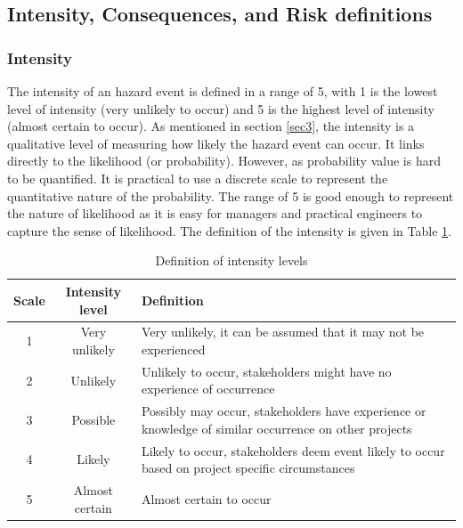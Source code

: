 \documentclass[10pt,halfline,a4paper]{ouparticle}
\begin{document}
\subsection{Intensity, Consequences, and Risk definitions}
\subsubsection{Intensity} \label{lik}
The intensity of an hazard event is defined in a range of 5, with 1 is the lowest level of intensity (very unlikely to occur) and 5 is the highest level of intensity (almost certain to occur). As mentioned in section \ref{sec3}, the intensity is a qualitative level of measuring how likely the hazard event can occur. It links directly to the likelihood (or probability). However, as probability value is hard to be quantified. It is practical to use a discrete scale to represent the quantitative nature of the probability. The range of 5 is good enough to represent the nature of likelihood as it is easy for managers and practical engineers to capture the sense of likelihood. The definition of the intensity is given in Table \ref{tbl_intensity}.

\begin{table}
	\centering
	\caption{Definition of intensity levels} 
	\begin{tabular}{l|p{2cm}|p{10cm}}
		\hline
		\multicolumn{1}{c|}{Scale} & \multicolumn{1}{c|}{Intensity level} & Definition \\ 
		\hline
		\multicolumn{1}{c|}{1} & \multicolumn{1}{c|}{Very unlikely} & Very unlikely, it can be assumed that it may not be experienced \\ 
		\multicolumn{1}{c|}{2} & \multicolumn{1}{c|}{Unlikely} & Unlikely to occur, stakeholders might have no experience of occurrence \\ 
		\multicolumn{1}{c|}{3} & \multicolumn{1}{c|}{Possible} & Possibly may occur, stakeholders have experience or knowledge of similar occurrence on other projects \\ 
		\multicolumn{1}{c|}{4} & \multicolumn{1}{c|}{Likely} & Likely to occur, stakeholders deem event likely to occur based on project specific circumstances \\ 
		\multicolumn{1}{c|}{5} & \multicolumn{1}{c|}{Almost certain} & Almost certain to occur \\ 
		\hline
	\end{tabular}
	\label{tbl_intensity}
\end{table}
\end{document}

